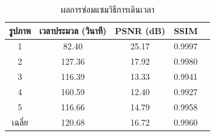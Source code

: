 \begin{table}[H]
	\centering
	\begin{tabular}[ht]{|c|c|c|c|c|}
		\hline
		รูปภาพ &เวลาประมวล  (วินาที) & PSNR (dB) & SSIM \\
		\hline
		1 & 82.40 & 25.17 & 0.9997 \\ 
		2 & 127.36 & 17.92 & 0.9980 \\
		3 &  116.39 & 13.33 & 0.9941 \\
		4 & 160.59  &12.40  & 0.9927 \\
		5 & 116.66  & 14.79  & 0.9958 \\
		\hline
		เฉลี่ย & 120.68  & 16.72  & 0.9960 \\
		\hline
	\end{tabular}
	\caption{ผลการซ่อมแซมวิธีการเดินเวลา}
	\label{result:table-timemarching}
\end{table}	
